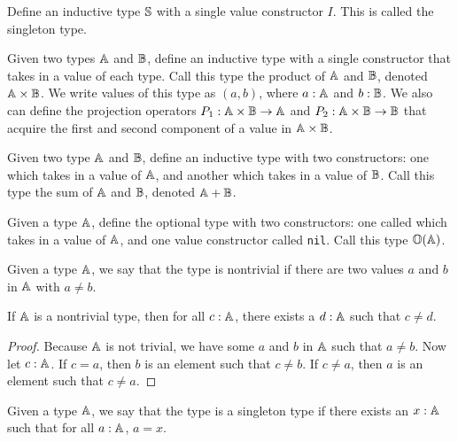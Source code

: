 \documentclass[../math.tex]{subfiles}
\begin{document}
\begin{definition}
    Define an inductive type $\S$ with a single value constructor $I$.  This is
    called the singleton type.
\end{definition}

\begin{definition}
    Given two types $\A$ and $\B$, define an inductive type with a single
    constructor that takes in a value of each type.  Call this type the product
    of $\A$ and $\B$, denoted $\A \times \B$.  We write values of this type as
    $(a, b)$, where $a : \A$ and $b : \B$.  We also can define the projection
    operators $P_1 : \A \times \B \rightarrow \A$ and $P_2 : \A \times \B
    \rightarrow \B$ that acquire the first and second component of a value in
    $\A \times \B$.
\end{definition}

\begin{definition}
    Given two type $\A$ and $\B$, define an inductive type with two
    constructors: one which takes in a value of $\A$, and another which takes in
    a value of $\B$.  Call this type the sum of $\A$ and $\B$, denoted $\A +
    \B$.
\end{definition}

\begin{definition}
    Given a type $\A$, define the optional type with two constructors: one
    called  which takes in a value of $\A$, and one value constructor
    called \verb|nil|.  Call this type $\O(\A)$.
\end{definition}

\begin{class}
    Given a type $\A$, we say that the type is nontrivial if there are two
    values $a$ and $b$ in $\A$ with $a \neq b$.
\end{class}

\begin{theorem} \label{not_trivial2}
    If $\A$ is a nontrivial type, then for all $c : \A$, there exists a $d : \A$
    such that $c \neq d$.
\end{theorem}
\begin{proof}
    Because $\A$ is not trivial, we have some $a$ and $b$ in $\A$ such that $a
    \neq b$.  Now let $c : \A$.  If $c = a$, then $b$ is an element such that $c
    \neq b$.  If $c \neq a$, then $a$ is an element such that $c \neq a$.
\end{proof}

\begin{class}
    Given a type $\A$, we say that the type is a singleton type if there exists
    an $x : \A$ such that for all $a : \A$, $a = x$.
\end{class}
\end{document}

